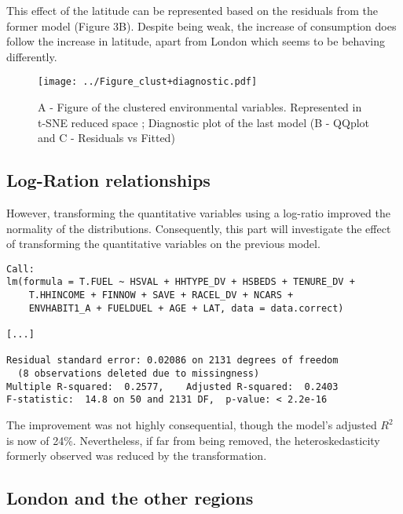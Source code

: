 \documentclass[12pt]{article}
\begin{document}
This effect of the latitude can be represented based on the residuals from the former model (Figure 3B). Despite being weak, the increase of consumption does follow the increase in latitude, apart from London which seems to be behaving differently.\\

\begin{figure}[!h]
\begin{center}
\texttt{[image: ../Figure\_clust+diagnostic.pdf]}
\end{center}
\caption{\footnotesize{A - Figure of the clustered environmental variables. Represented in t-SNE reduced space ; Diagnostic plot of the last model (B - QQplot and C - Residuals vs Fitted)}}
\label{Figure 4}
\end{figure}

\subsection{Log-Ration relationships}

However, transforming the quantitative variables using a log-ratio improved the normality of the distributions. Consequently, this part will investigate the effect of transforming the quantitative variables on the previous model.\\

\begin{Answer}
\begin{verbatim}
Call:
lm(formula = T.FUEL ~ HSVAL + HHTYPE_DV + HSBEDS + TENURE_DV + 
    T.HHINCOME + FINNOW + SAVE + RACEL_DV + NCARS + 
    ENVHABIT1_A + FUELDUEL + AGE + LAT, data = data.correct)
    
[...]

Residual standard error: 0.02086 on 2131 degrees of freedom
  (8 observations deleted due to missingness)
Multiple R-squared:  0.2577,	Adjusted R-squared:  0.2403 
F-statistic:  14.8 on 50 and 2131 DF,  p-value: < 2.2e-16
\end{verbatim}
\end{Answer}

The improvement was not highly consequential, though the model's adjusted $R^2$ is now of 24\%. Nevertheless, if far from being removed, the heteroskedasticity formerly observed was reduced by the transformation.

\subsection{London and the other regions}
\end{document}
